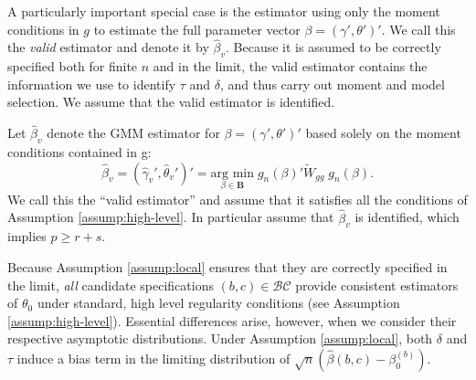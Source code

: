   A particularly important special case is the estimator using only the moment conditions in $g$ to estimate the full parameter vector $\beta = \left(\gamma', \theta' \right)'$.
  We call this the \emph{valid} estimator and denote it by $\widehat{\beta}_v$.  
  Because it is assumed to be correctly specified both for finite $n$ and in the limit, the valid estimator contains the information we use to identify $\tau$ and $\delta$, and thus carry out moment and model selection. 
We assume that the valid estimator is identified.

\begin{assump}
  Let $\widehat{\beta}_v$ denote the GMM estimator for $\beta = \left(\gamma', \theta' \right)'$ based solely on the moment conditions contained in g:
\begin{equation}
  \widehat{\beta}_v = \left(\widehat{\gamma}_{v}', \widehat{\theta}_{v}'\right)' =\underset{\beta \in \mathbf{B}}{\mbox{arg min}}\; g_n(\beta)' \widetilde{W}_{gg} \; g_n(\beta).
\end{equation}
We call this the ``valid estimator'' and assume that it satisfies all the conditions of Assumption \ref{assump:high-level}.
In particular assume that $\widehat{\beta}_v$ is identified, which implies $p \geq r+s$.
\end{assump}

Because Assumption \ref{assump:local} ensures that they are correctly specified in the limit, \emph{all} candidate specifications $(b,c)\in \mathcal{BC}$ provide consistent estimators of $\theta_0$ under standard, high level regularity conditions (see Assumption \ref{assump:high-level}).
Essential differences arise, however, when we consider their respective asymptotic distributions. 
Under Assumption \ref{assump:local}, both $\delta$ and $\tau$ induce a bias term in the limiting distribution of $\sqrt{n}\left(\widehat{\beta}(b,c) - \beta_0^{(b)}\right)$. 

